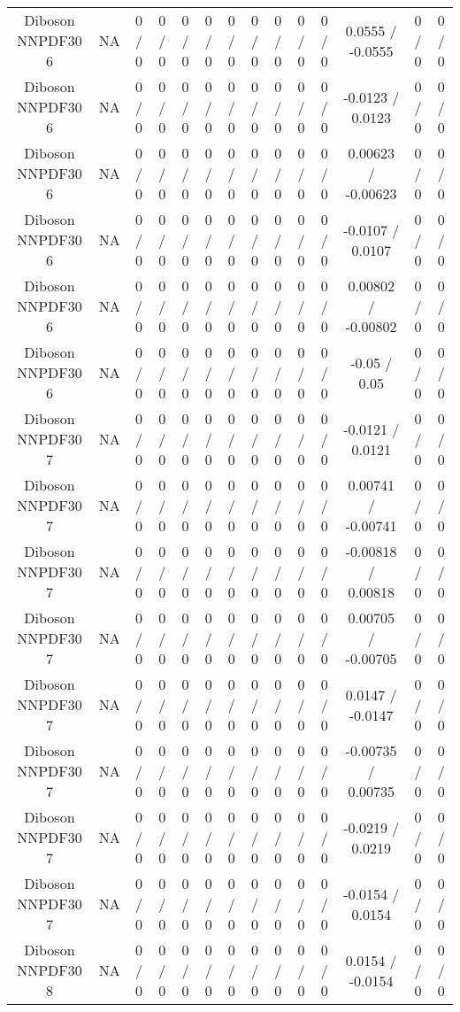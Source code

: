\documentclass[10pt]{article}
\begin{document}
\begin{table}[htbp]
\begin{center}
\begin{tabular}{|c|c|c|c|c|c|c|c|c|c|c|c|c|c|}
  Diboson NNPDF30 6 &    NA    & 0 / 0 & 0 / 0 & 0 / 0 & 0 / 0 & 0 / 0 & 0 / 0 & 0 / 0 & 0 / 0 & 0 / 0 & 0.0555 / -0.0555 & 0 / 0 & 0 / 0 \\ 
  Diboson NNPDF30 6 &    NA    & 0 / 0 & 0 / 0 & 0 / 0 & 0 / 0 & 0 / 0 & 0 / 0 & 0 / 0 & 0 / 0 & 0 / 0 & -0.0123 / 0.0123 & 0 / 0 & 0 / 0 \\ 
  Diboson NNPDF30 6 &    NA    & 0 / 0 & 0 / 0 & 0 / 0 & 0 / 0 & 0 / 0 & 0 / 0 & 0 / 0 & 0 / 0 & 0 / 0 & 0.00623 / -0.00623 & 0 / 0 & 0 / 0 \\ 
  Diboson NNPDF30 6 &    NA    & 0 / 0 & 0 / 0 & 0 / 0 & 0 / 0 & 0 / 0 & 0 / 0 & 0 / 0 & 0 / 0 & 0 / 0 & -0.0107 / 0.0107 & 0 / 0 & 0 / 0 \\ 
  Diboson NNPDF30 6 &    NA    & 0 / 0 & 0 / 0 & 0 / 0 & 0 / 0 & 0 / 0 & 0 / 0 & 0 / 0 & 0 / 0 & 0 / 0 & 0.00802 / -0.00802 & 0 / 0 & 0 / 0 \\ 
  Diboson NNPDF30 6 &    NA    & 0 / 0 & 0 / 0 & 0 / 0 & 0 / 0 & 0 / 0 & 0 / 0 & 0 / 0 & 0 / 0 & 0 / 0 & -0.05 / 0.05 & 0 / 0 & 0 / 0 \\ 
  Diboson NNPDF30 7 &    NA    & 0 / 0 & 0 / 0 & 0 / 0 & 0 / 0 & 0 / 0 & 0 / 0 & 0 / 0 & 0 / 0 & 0 / 0 & -0.0121 / 0.0121 & 0 / 0 & 0 / 0 \\ 
  Diboson NNPDF30 7 &    NA    & 0 / 0 & 0 / 0 & 0 / 0 & 0 / 0 & 0 / 0 & 0 / 0 & 0 / 0 & 0 / 0 & 0 / 0 & 0.00741 / -0.00741 & 0 / 0 & 0 / 0 \\ 
  Diboson NNPDF30 7 &    NA    & 0 / 0 & 0 / 0 & 0 / 0 & 0 / 0 & 0 / 0 & 0 / 0 & 0 / 0 & 0 / 0 & 0 / 0 & -0.00818 / 0.00818 & 0 / 0 & 0 / 0 \\ 
  Diboson NNPDF30 7 &    NA    & 0 / 0 & 0 / 0 & 0 / 0 & 0 / 0 & 0 / 0 & 0 / 0 & 0 / 0 & 0 / 0 & 0 / 0 & 0.00705 / -0.00705 & 0 / 0 & 0 / 0 \\ 
  Diboson NNPDF30 7 &    NA    & 0 / 0 & 0 / 0 & 0 / 0 & 0 / 0 & 0 / 0 & 0 / 0 & 0 / 0 & 0 / 0 & 0 / 0 & 0.0147 / -0.0147 & 0 / 0 & 0 / 0 \\ 
  Diboson NNPDF30 7 &    NA    & 0 / 0 & 0 / 0 & 0 / 0 & 0 / 0 & 0 / 0 & 0 / 0 & 0 / 0 & 0 / 0 & 0 / 0 & -0.00735 / 0.00735 & 0 / 0 & 0 / 0 \\ 
  Diboson NNPDF30 7 &    NA    & 0 / 0 & 0 / 0 & 0 / 0 & 0 / 0 & 0 / 0 & 0 / 0 & 0 / 0 & 0 / 0 & 0 / 0 & -0.0219 / 0.0219 & 0 / 0 & 0 / 0 \\ 
  Diboson NNPDF30 7 &    NA    & 0 / 0 & 0 / 0 & 0 / 0 & 0 / 0 & 0 / 0 & 0 / 0 & 0 / 0 & 0 / 0 & 0 / 0 & -0.0154 / 0.0154 & 0 / 0 & 0 / 0 \\ 
  Diboson NNPDF30 8 &    NA    & 0 / 0 & 0 / 0 & 0 / 0 & 0 / 0 & 0 / 0 & 0 / 0 & 0 / 0 & 0 / 0 & 0 / 0 & 0.0154 / -0.0154 & 0 / 0 & 0 / 0 \\ 

\end{tabular}
\end{center}
\end{table}
\end{document}

